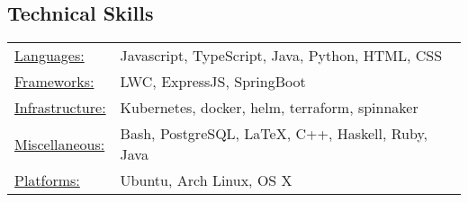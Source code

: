 \documentclass[12pt]{res}
\begin{document}
\begin{resume}
% 

\section{Technical Skills}
\begin{tabular}{l p{4in}}
    \underline{Languages:} & Javascript, TypeScript, Java, Python, HTML, CSS \\
    \underline{Frameworks:} & LWC, ExpressJS, SpringBoot \\
    \underline{Infrastructure:} & Kubernetes, docker, helm, terraform, spinnaker \\
    \underline{Miscellaneous:} & Bash, PostgreSQL, \LaTeX, C++, Haskell, Ruby, Java \\
    \underline{Platforms:} & Ubuntu, Arch Linux, OS X
\end{tabular}

\end{resume}
\end{document}
